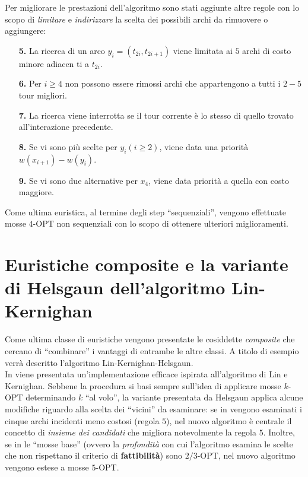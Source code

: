 Per migliorare le prestazioni dell'algoritmo sono stati aggiunte altre regole con lo scopo di 
\textit{limitare} e \textit{indirizzare} la scelta dei possibili archi da rimuovere o aggiungere:
\begin{enumerate}
    \setcounter{enumi}{4}
    \item[\textbf{5.}] La ricerca di un arco $y_i=(t_{2i},t_{2i+1})$ viene limitata ai $5$ archi di costo minore
            adiacen ti a $t_{2i}$.
    \item[\textbf{6.}] Per $i\geq{}4$ non possono essere rimossi archi che appartengono a tutti i $2-5$
            tour migliori.
    \item[\textbf{7.}] La ricerca viene interrotta se il tour corrente è lo stesso di quello trovato all'interazione
            precedente.
    \item[\textbf{8.}] Se vi sono più scelte per $y_i (i\geq{}2)$, viene data una priorità $w(x_{i+1})-w(y_i)$.
    \item[\textbf{9.}] Se vi sono due alternative per $x_4$, viene data priorità a quella con costo maggiore.
\end{enumerate}

Come ultima euristica, al termine degli step ``sequenziali'', vengono effettuate mosse $4$-OPT non sequenziali
con lo scopo di ottenere ulteriori miglioramenti.

\section{Euristiche composite e la variante di Helsgaun dell'algoritmo Lin-Kernighan}

Come ultima classe di euristiche vengono presentate le cosiddette \textit{composite} che cercano di ``combinare''
i vantaggi di entrambe le altre classi. A titolo di esempio verrà descritto l'algoritmo Lin-Kernighan-Helsgaun.\\

In \cite{LKH} viene presentata un'implementazione efficace ispirata all'algoritmo di Lin e Kernighan.
Sebbene la procedura si basi sempre sull'idea di applicare mosse $k$-OPT determinando $k$ ``al volo'', la 
variante presentata da Helsgaun applica alcune modifiche riguardo alla scelta dei ``vicini'' da esaminare:
se in \cite{LK} vengono esaminati i cinque archi incidenti meno costosi (regola $5$), nel nuovo algoritmo
è centrale il concetto di \textit{insieme dei candidati} che migliora notevolmente la regola $5$. Inoltre,
se in \cite{LK} le ``mosse base'' (ovvero la \textit{profondità} con cui l'algoritmo esamina le scelte che
non rispettano il criterio di \textbf{fattibilità}) sono $2/3$-OPT, nel nuovo algoritmo vengono estese a mosse 
$5$-OPT.

